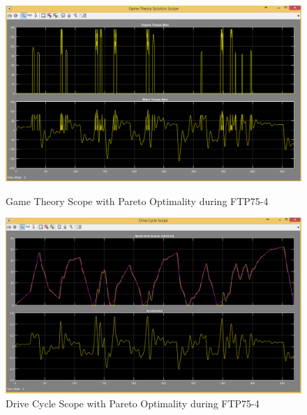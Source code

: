 \begin{figure}[hp]
\centering
\includegraphics[scale=0.45]{figures/Pareto/FTP75-4/gameTheory05Juli}
\caption{Game Theory Scope with Pareto Optimality during FTP75-4}
\label{fig:gtpo4}
\includegraphics[scale=0.41]{figures/Pareto/FTP75-4/driveCycle05Juli}
\caption{Drive Cycle Scope with Pareto Optimality during FTP75-4}
\label{fig:dcpo4}
\end{figure}

